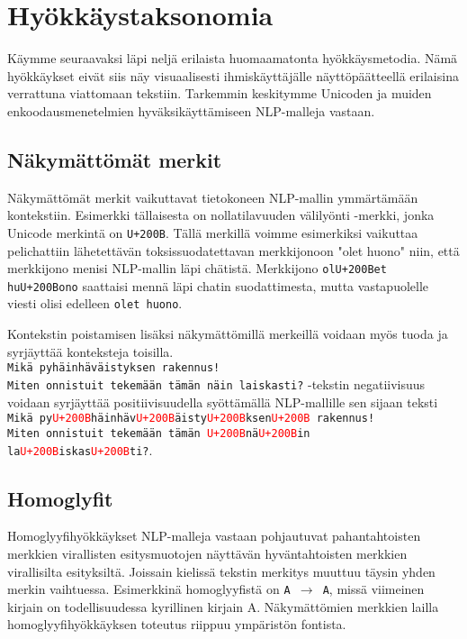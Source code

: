 \chapter{Hyökkäystaksonomia\label{methods}}
Käymme seuraavaksi läpi neljä erilaista huomaamatonta hyökkäysmetodia. Nämä hyökkäykset eivät siis näy visuaalisesti ihmiskäyttäjälle näyttöpäätteellä erilaisina verrattuna viattomaan tekstiin. Tarkemmin keskitymme Unicoden ja muiden enkoodausmenetelmien hyväksikäyttämiseen NLP-malleja vastaan.

\section{Näkymättömät merkit}
Näkymättömät merkit vaikuttavat tietokoneen NLP-mallin ymmärtämään kontekstiin. Esimerkki tällaisesta on nollatilavuuden välilyönti -merkki, jonka Unicode merkintä on \texttt{U+200B}. Tällä merkillä voimme esimerkiksi vaikuttaa pelichattiin lähetettävän toksissuodatettavan merkkijonoon "olet huono" niin, että merkkijono menisi NLP-mallin läpi chätistä. Merkkijono \texttt{olU+200Bet huU+200Bono} saattaisi mennä läpi chatin suodattimesta, mutta vastapuolelle viesti olisi edelleen \texttt{olet huono}.

Kontekstin poistamisen lisäksi näkymättömillä merkeillä voidaan myös tuoda ja syrjäyttää konteksteja toisilla.\\
\texttt{Mikä pyhäinhäväistyksen rakennus!\\
Miten onnistuit tekemään tämän näin laiskasti?} -tekstin negatiivisuus voidaan syrjäyttää positiivisuudella syöttämällä NLP-mallille sen sijaan teksti \\
\texttt{Mikä py\textcolor{red}{U+200B}häinhäv\textcolor{red}{U+200B}äisty\textcolor{red}{U+200B}ksen\textcolor{red}{U+200B} rakennus!\\
Miten onnistuit tekemään tämän \textcolor{red}{U+200B}nä\textcolor{red}{U+200B}in la\textcolor{red}{U+200B}iskas\textcolor{red}{U+200B}ti?}.

\section{Homoglyfit}
Homoglyyfihyökkäykset NLP-malleja vastaan pohjautuvat pahantahtoisten merkkien virallisten esitysmuotojen näyttävän hyväntahtoisten merkkien virallisilta esityksiltä. Joissain kielissä tekstin merkitys muuttuu täysin yhden merkin vaihtuessa. Esimerkkinä homoglyyfistä on \texttt{A $\rightarrow$ A}, missä viimeinen kirjain on todellisuudessa kyrillinen kirjain A. Näkymättömien merkkien lailla homoglyyfihyökkäyksen toteutus riippuu ympäristön fontista.

